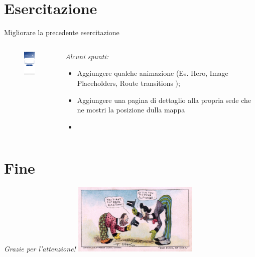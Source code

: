 \documentclass{../libs/presentation_format}
\begin{document}
\section{Esercitazione}
\begin{frame}{Migliorare la precedente esercitazione}
	\begin{minipage}[0.2\textheight]{\textwidth}
		\begin{columns}[T]
			\begin{column}{0.4\textwidth}
				\begin{figure}[htpb]
					\centering
					\includegraphics[width=2cm]{../libs/login-page}
				\end{figure}
			\end{column}
			\begin{column}{0.6\textwidth}
				\emph{Alcuni spunti:}
				\begin{itemize}
					\item Aggiungere qualche animazione (Es. Hero, Image Placeholders, Route transitions );
					\item Aggiungere una pagina di dettaglio alla propria sede che ne mostri la posizione dulla mappa
					\item \href{https://pub.dev/packages/flutter_map}{}
				\end{itemize}
			\end{column}
		\end{columns}
	\end{minipage}
\end{frame}



\section{Fine}
\begin{frame}{}
	\huge\emph{Grazie per l'attenzione!}
	\newline
	\vfill
	\hfill\includegraphics[width=6cm]{../libs/alphonse-gaston-regards}
\end{frame}
\end{document}
